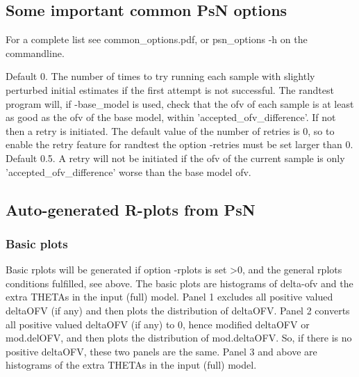 \subsection{Some important common PsN options}
For a complete list see common\_options.pdf, 
or psn\_options -h on the commandline.

\begin{optionlist}
Default 0. The number of times to try running each sample with slightly perturbed initial estimates if the first attempt is not successful.
The randtest program will, if -base\_model is used, check that the ofv of each sample is at least as good as the ofv of
the base model, within 'accepted\_ofv\_difference'. If not then a retry is initiated. The default value of the number of
retries is 0, so to enable the retry feature for randtest the option -retries must be set larger than 0. 
\nextopt
{}
Default 0.5. A retry will not be initiated if the ofv of the current sample is only 'accepted\_ofv\_difference' worse than
the base model ofv.
\nextopt
\end{optionlist}


\subsection{Auto-generated R-plots from PsN}
\newcommand{\rplotsconditions}{The default randtest template 
requires that option -base\_model was used, and also 
that R libraries
ggplot2, reshape2, gridExtra, scales, MASS and plotrix are installed.
It is assumed that input (full) model has more THETAs than base (reduced) model,
and that the additional THETAs are the ones relevant for the
randomization column.
If the conditions are not fulfilled then no pdf will be generated,
see the .Rout file in the main run directory for error messages.}


\subsubsection*{Basic plots}
Basic rplots will be generated if option -rplots is set >0,
and the general rplots conditions fulfilled, see above.
The basic plots are
histograms of delta-ofv and the extra THETAs in the input (full) model.
Panel 1 excludes all positive valued deltaOFV (if any) 
and then plots the distribution of deltaOFV. 
Panel 2 converts all positive valued deltaOFV (if any) to 0, 
hence modified deltaOFV or mod.delOFV, 
and then plots the distribution of mod.deltaOFV. 
So, if there is no positive deltaOFV, these two panels are the same.
Panel 3 and above are histograms of the extra THETAs in the input (full) model.
